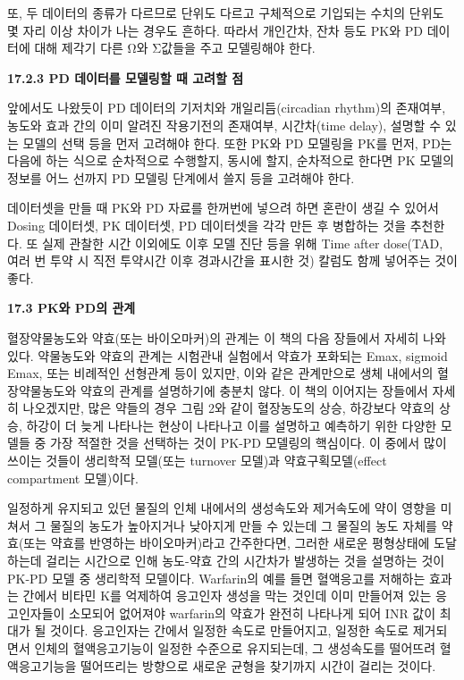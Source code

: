 \documentclass[
  10pt,
]{krantz}
\begin{document}
또, 두 데이터의 종류가 다르므로 단위도 다르고 구체적으로 기입되는 수치의 단위도 몇 자리 이상 차이가 나는 경우도 흔하다.
따라서 개인간차, 잔차 등도 PK와 PD 데이터에 대해 제각기 다른 Ω와 Σ값들을 주고 모델링해야 한다.

\textbf{17.2.3 PD 데이터를 모델링할 때 고려할 점}

앞에서도 나왔듯이 PD 데이터의 기저치와 개일리듬(circadian rhythm)의 존재여부, 농도와 효과 간의 이미 알려진
작용기전의 존재여부, 시간차(time delay), 설명할 수 있는 모델의 선택 등을 먼저 고려해야 한다. 또한 PK와
PD 모델링을 PK를 먼저, PD는 다음에 하는 식으로 순차적으로 수행할지, 동시에 할지, 순차적으로 한다면 PK 모델의 정보를
어느 선까지 PD 모델링 단계에서 쓸지 등을 고려해야 한다.

데이터셋을 만들 때 PK와 PD 자료를 한꺼번에 넣으려 하면 혼란이 생길 수 있어서 Dosing 데이터셋, PK 데이터셋, PD
데이터셋을 각각 만든 후 병합하는 것을 추천한다. 또 실제 관찰한 시간 이외에도 이후 모델 진단 등을 위해 Time after
dose(TAD, 여러 번 투약 시 직전 투약시간 이후 경과시간을 표시한 것) 칼럼도 함께 넣어주는 것이 좋다.

\textbf{17.3 PK와 PD의 관계}

혈장약물농도와 약효(또는 바이오마커)의 관계는 이 책의 다음 장들에서 자세히 나와 있다. 약물농도와 약효의 관계는 시험관내
실험에서 약효가 포화되는 Emax, sigmoid Emax, 또는 비례적인 선형관계 등이 있지만, 이와 같은
관계만으로 생체 내에서의 혈장약물농도와 약효의 관계를 설명하기에 충분치 않다. 이 책의 이어지는 장들에서 자세히
나오겠지만, 많은 약들의 경우 그림 2와 같이 혈장농도의 상승, 하강보다 약효의 상승, 하강이 더 늦게 나타나는 현상이
나타나고 이를 설명하고 예측하기 위한 다양한 모델들 중 가장 적절한 것을 선택하는 것이 PK-PD 모델링의 핵심이다. 이
중에서 많이 쓰이는 것들이 생리학적 모델(또는 turnover 모델)과 약효구획모델(effect compartment
모델)이다.

일정하게 유지되고 있던 물질의 인체 내에서의 생성속도와 제거속도에 약이 영향을 미쳐서 그 물질의 농도가 높아지거나 낮아지게 만들
수 있는데 그 물질의 농도 자체를 약효(또는 약효를 반영하는 바이오마커)라고 간주한다면, 그러한 새로운 평형상태에 도달하는데
걸리는 시간으로 인해 농도-약효 간의 시간차가 발생하는 것을 설명하는 것이 PK-PD 모델 중 생리학적 모델이다.
Warfarin의 예를 들면 혈액응고를 저해하는 효과는 간에서 비타민 K를 억제하여 응고인자 생성을 막는 것인데 이미 만들어져
있는 응고인자들이 소모되어 없어져야 warfarin의 약효가 완전히 나타나게 되어 INR 값이 최대가 될 것이다.
응고인자는 간에서 일정한 속도로 만들어지고, 일정한 속도로 제거되면서 인체의 혈액응고기능이 일정한 수준으로
유지되는데, 그 생성속도를 떨어뜨려 혈액응고기능을 떨어뜨리는 방향으로 새로운 균형을 찾기까지 시간이 걸리는 것이다.
\end{document}
